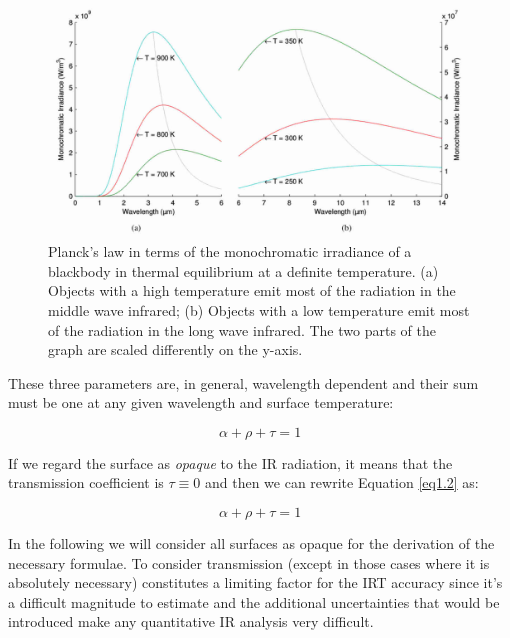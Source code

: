 		\begin{figure}[ht!]
			\centering
			\captionsetup{justification=centering,margin=2cm}
			\includegraphics[scale=0.35]{Figures/Chapter01/PlankFunction.jpg}
			\caption{Planck’s law in terms of the  monochromatic irradiance of  a blackbody in thermal equilibrium at a definite temperature. (a) Objects with a high temperature emit most of the radiation in the middle wave infrared; (b) Objects with a low temperature emit most of the radiation in the long wave infrared. The two parts of the graph are scaled differently on the y-axis.}\label{fig1.3}
		\end{figure}		
		
		These three parameters are, in general, wavelength dependent and their sum must be one at any given wavelength and surface temperature:
		
		\begin{equation}\label{eq1.2}
			\alpha + \rho + \tau = 1
		\end{equation}\bigskip
		
		If we regard the surface as \textit{opaque} to the IR radiation, it means that the transmission coefficient is $\tau \equiv 0$ and then we can rewrite Equation \ref{eq1.2} as:	
		
		\begin{equation}\label{eq1.3}
			\alpha + \rho + \tau = 1
		\end{equation}\bigskip
		
		In the following we will consider all surfaces as opaque for the derivation of the necessary formulae. To consider transmission (except in those cases where it is absolutely necessary) constitutes a limiting factor for the IRT accuracy since it's a difficult magnitude to estimate and the additional uncertainties that would be introduced make any quantitative IR analysis very difficult.
		\bigskip
		
